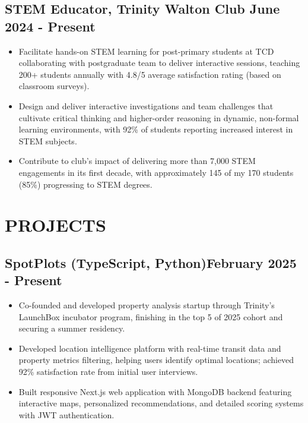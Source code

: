 \documentclass[10pt,a4paper]{article}
\begin{document}
\subsection{STEM Educator, Trinity Walton Club \hfill June 2024 - Present}
\begin{itemize}
\item Facilitate hands-on STEM learning for post-primary students at TCD collaborating with postgraduate  team to deliver interactive sessions, teaching 200+ students annually with 4.8/5 average satisfaction rating (based on classroom surveys).
\item Design and deliver interactive investigations and team challenges that cultivate critical thinking and higher-order reasoning in dynamic, non-formal learning environments, with 92\% of students reporting increased interest in STEM subjects. 
\item Contribute to club's impact of delivering more than 7,000 STEM engagements in its first decade, with approximately 145 of my 170 students (85\%) progressing to STEM degrees.
\end{itemize}

\section{PROJECTS}

\subsection{SpotPlots (TypeScript, Python)\hfill February 2025 - Present}
\begin{itemize}
\item Co-founded and developed property analysis startup through Trinity's LaunchBox incubator program, finishing in the top 5 of 2025 cohort and securing a summer residency.
\item Developed location intelligence platform with real-time transit data and property metrics filtering, helping users identify optimal locations; achieved 92\% satisfaction rate from initial user interviews.
\item Built responsive Next.js web application with MongoDB backend featuring interactive maps, personalized recommendations, and detailed scoring systems with JWT authentication.
\end{itemize}
\end{document}
